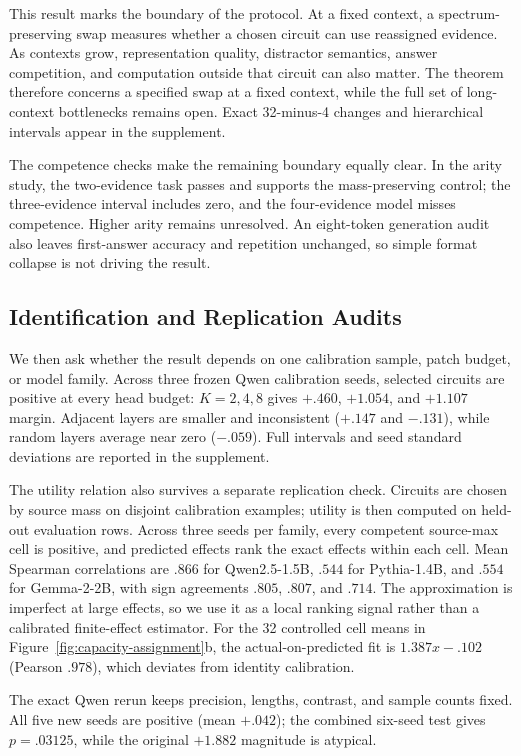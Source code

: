 \documentclass[letterpaper]{article} %
\begin{document}
This result marks the boundary of the protocol. At a fixed context, a spectrum-preserving swap measures whether a
chosen circuit can use reassigned evidence. As contexts grow, representation quality, distractor semantics,
answer competition, and computation outside that circuit can also matter. The theorem therefore concerns a
specified swap at a fixed context, while the full set of long-context bottlenecks remains open. Exact
32-minus-4 changes and hierarchical intervals appear in the supplement.

The competence checks make the remaining boundary equally clear. In the arity study, the two-evidence task
passes and supports the mass-preserving control; the three-evidence interval includes zero, and the
four-evidence model misses competence. Higher arity remains unresolved. An eight-token generation audit also
leaves first-answer accuracy and repetition unchanged, so simple format collapse is not driving the result.

\subsection{Identification and Replication Audits}

We then ask whether the result depends on one calibration sample, patch budget, or model family. Across three
frozen Qwen calibration seeds, selected circuits are positive at every head budget: $K=2,4,8$ gives
$+.460$, $+1.054$, and $+1.107$ margin. Adjacent layers are smaller and inconsistent ($+.147$ and
$-.131$), while random layers average near zero ($-.059$). Full intervals and seed standard deviations are
reported in the supplement.

The utility relation also survives a separate replication check. Circuits are chosen by source mass on
disjoint calibration examples; utility is then computed on held-out evaluation rows. Across three seeds per
family, every competent source-max cell is positive, and predicted effects rank the exact effects within each
cell. Mean Spearman correlations are $.866$ for Qwen2.5-1.5B, $.544$ for Pythia-1.4B, and $.554$ for
Gemma-2-2B, with sign agreements $.805$, $.807$, and $.714$. The approximation is imperfect at large effects,
so we use it as a local ranking signal rather than a calibrated finite-effect estimator. For the 32 controlled cell means in
Figure~\ref{fig:capacity-assignment}b, the actual-on-predicted fit is $1.387x-.102$ (Pearson $.978$), which
deviates from identity calibration.

The exact Qwen rerun keeps precision, lengths, contrast, and sample counts fixed. All five new seeds are positive
(mean $+.042$); the combined six-seed test gives $p=.03125$, while the original $+1.882$ magnitude is atypical.
\end{document}
